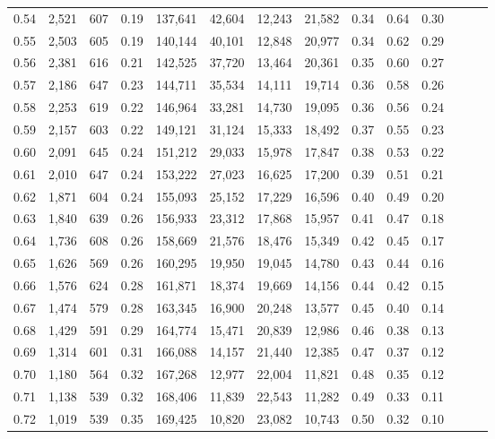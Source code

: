 \begin{tabular}{rrrrrrrrrrrrrr}
0.54 &  2,521 &  607 &  0.19 &  137,641 &   42,604 &  12,243 &  21,582 &  0.34 &  0.64 &      0.30 \\
0.55 &  2,503 &  605 &  0.19 &  140,144 &   40,101 &  12,848 &  20,977 &  0.34 &  0.62 &      0.29 \\
0.56 &  2,381 &  616 &  0.21 &  142,525 &   37,720 &  13,464 &  20,361 &  0.35 &  0.60 &      0.27 \\
0.57 &  2,186 &  647 &  0.23 &  144,711 &   35,534 &  14,111 &  19,714 &  0.36 &  0.58 &      0.26 \\
0.58 &  2,253 &  619 &  0.22 &  146,964 &   33,281 &  14,730 &  19,095 &  0.36 &  0.56 &      0.24 \\
0.59 &  2,157 &  603 &  0.22 &  149,121 &   31,124 &  15,333 &  18,492 &  0.37 &  0.55 &      0.23 \\
0.60 &  2,091 &  645 &  0.24 &  151,212 &   29,033 &  15,978 &  17,847 &  0.38 &  0.53 &      0.22 \\
0.61 &  2,010 &  647 &  0.24 &  153,222 &   27,023 &  16,625 &  17,200 &  0.39 &  0.51 &      0.21 \\
0.62 &  1,871 &  604 &  0.24 &  155,093 &   25,152 &  17,229 &  16,596 &  0.40 &  0.49 &      0.20 \\
0.63 &  1,840 &  639 &  0.26 &  156,933 &   23,312 &  17,868 &  15,957 &  0.41 &  0.47 &      0.18 \\
0.64 &  1,736 &  608 &  0.26 &  158,669 &   21,576 &  18,476 &  15,349 &  0.42 &  0.45 &      0.17 \\
0.65 &  1,626 &  569 &  0.26 &  160,295 &   19,950 &  19,045 &  14,780 &  0.43 &  0.44 &      0.16 \\
0.66 &  1,576 &  624 &  0.28 &  161,871 &   18,374 &  19,669 &  14,156 &  0.44 &  0.42 &      0.15 \\
0.67 &  1,474 &  579 &  0.28 &  163,345 &   16,900 &  20,248 &  13,577 &  0.45 &  0.40 &      0.14 \\
0.68 &  1,429 &  591 &  0.29 &  164,774 &   15,471 &  20,839 &  12,986 &  0.46 &  0.38 &      0.13 \\
0.69 &  1,314 &  601 &  0.31 &  166,088 &   14,157 &  21,440 &  12,385 &  0.47 &  0.37 &      0.12 \\
0.70 &  1,180 &  564 &  0.32 &  167,268 &   12,977 &  22,004 &  11,821 &  0.48 &  0.35 &      0.12 \\
0.71 &  1,138 &  539 &  0.32 &  168,406 &   11,839 &  22,543 &  11,282 &  0.49 &  0.33 &      0.11 \\
0.72 &  1,019 &  539 &  0.35 &  169,425 &   10,820 &  23,082 &  10,743 &  0.50 &  0.32 &      0.10 \\

\end{tabular}
